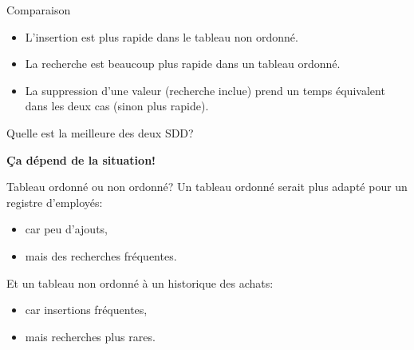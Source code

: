 \documentclass[12pt,a4paper,handout]{beamer}
\begin{document}
%
%




\begin{frame}{Comparaison}
\begin{itemize}
\item L'insertion est plus rapide dans le tableau non ordonné.
\item La recherche est beaucoup plus rapide dans un tableau ordonné.
\item La suppression d'une valeur (recherche inclue) prend un temps équivalent dans les deux cas (sinon plus rapide).
\end{itemize}
\pause
Quelle est la meilleure des deux SDD?\newline
\pause
\begin{center}
\textcolor{blueemph}{\textbf{Ça dépend de la situation!}}
\end{center}
\end{frame}

\begin{frame}{Tableau ordonné ou non ordonné?}
Un tableau ordonné serait plus adapté pour un registre d'employés:
\begin{itemize}
\item car peu d'ajouts,
\item mais des recherches fréquentes.
\end{itemize}
Et un tableau non ordonné à un historique des achats:
\begin{itemize}
\item car insertions fréquentes,
\item mais recherches plus rares.
\end{itemize}

\end{frame}
\end{document}
